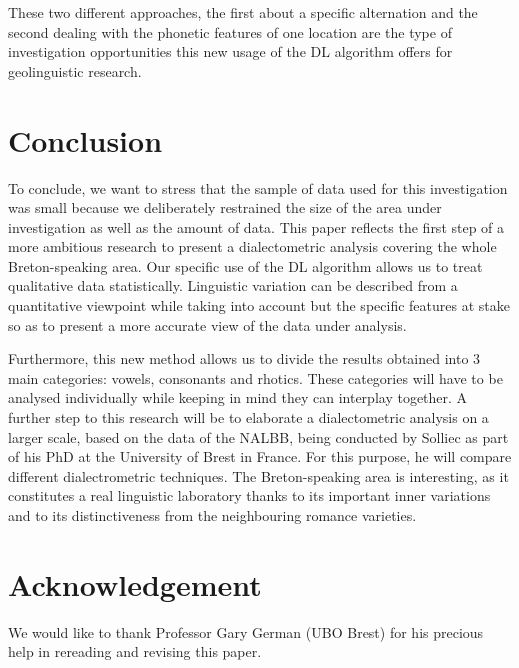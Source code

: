 \documentclass[output=paper]{LSP/langsci}
\begin{document}
These two different approaches, the first about a specific alternation and the second dealing with the phonetic features of one location are the type of investigation opportunities this new usage of the DL algorithm offers for geolinguistic research. 

\section{Conclusion}

To conclude, we want to stress that the sample of data used for this investigation was small because we deliberately restrained the size of the area under investigation as well as the amount of data. This paper reflects the first step of a more ambitious research to present a dialectometric analysis covering the whole Breton-speaking area. Our specific use of the DL algorithm allows us to treat qualitative data statistically. Linguistic variation can be described from a quantitative viewpoint while taking into account but the specific features at stake so as to present a more accurate view of the data under analysis.

Furthermore, this new method allows us to divide the results obtained into 3 main categories: vowels, consonants and rhotics. These categories will have to be analysed individually while keeping in mind they can interplay together. A further step to this research will be to elaborate a dialectometric analysis on a larger scale, based on the data of the NALBB, being conducted by Solliec as part of his PhD at the University of Brest in France. For this purpose, he will compare different dialectrometric techniques. The Breton-speaking area is interesting, as it constitutes a real linguistic laboratory thanks to its important inner variations and to its distinctiveness from the neighbouring romance varieties.

\section*{Acknowledgement}
We would like to thank Professor Gary German (UBO Brest) for his precious help in rereading and revising this paper.

\printbibliography[heading=subbibliography,notkeyword=this]
\end{document}
